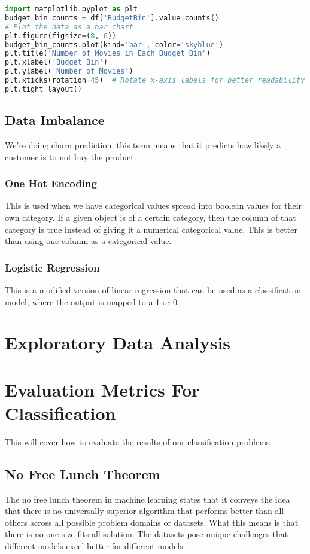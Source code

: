 \documentclass[11pt]{article}
\begin{document}
\begin{lstlisting}[language=Python,numbers=none]
import matplotlib.pyplot as plt
budget_bin_counts = df['BudgetBin'].value_counts()
# Plot the data as a bar chart
plt.figure(figsize=(8, 6))
budget_bin_counts.plot(kind='bar', color='skyblue')
plt.title('Number of Movies in Each Budget Bin')
plt.xlabel('Budget Bin')
plt.ylabel('Number of Movies')
plt.xticks(rotation=45)  # Rotate x-axis labels for better readability
plt.tight_layout()
\end{lstlisting}
\subsection{Data Imbalance}
\label{sec:org10c9d1f}
We're doing churn prediction, this term means that it predicts how likely a customer is to not buy the product.
\subsubsection{One Hot Encoding}
\label{sec:orgbeb470e}
This is used when we have categorical values spread into boolean values for their own category. If a given object is of a certain category, then the column of that category is true instead of giving it a numerical categorical value. This is better than using one column as a categorical value.
\subsubsection{Logistic Regression}
\label{sec:org3b142ce}
This is a modified version of linear regression that can be used as a classification model, where the output is mapped to a 1 or 0.
\section{Exploratory Data Analysis}
\label{sec:org104ffc3}
\section{Evaluation Metrics For Classification}
\label{sec:orga27da9d}
This will cover how to evaluate the results of our classification problems.
\subsection{No Free Lunch Theorem}
\label{sec:orgc5a188a}
The no free lunch theorem in machine learning states that it conveys the idea that there is no universally superior algorithm that performs better than all others across all possible problem domains or datasets. What this means is that there is no one-size-fits-all solution. The datasets pose unique challenges that different models excel better for different models.
\end{document}
